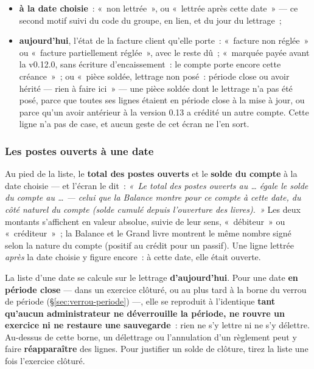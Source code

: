 \documentclass[a4paper,11pt,oneside]{article}
\begin{document}
\begin{itemize}
    \item \textbf{à la date choisie}~: «~non lettrée~», ou «~lettrée après cette date~» --- ce
          second motif suivi du code du groupe, en lien, et du jour du lettrage~;
    \item \textbf{aujourd'hui}, l'état de la facture client qu'elle porte~: «~facture non
          réglée~» ou «~facture partiellement réglée~», avec le reste dû~; «~marquée payée avant
          la v0.12.0, sans écriture d'encaissement~: le compte porte encore cette créance~»~;
          ou «~pièce soldée, lettrage non posé~: période close ou avoir hérité --- rien à faire
          ici~» --- une pièce soldée dont le lettrage n'a pas été posé, parce que toutes ses
          lignes étaient en période close à la mise à jour, ou parce qu'un avoir antérieur à la
          version 0.13 a crédité un autre compte. Cette ligne n'a pas de case, et aucun geste de
          cet écran ne l'en sort.
\end{itemize}

\subsubsection{Les postes ouverts à une date}

Au pied de la liste, le \textbf{total des postes ouverts} et le \textbf{solde du compte} à la
date choisie --- et l'écran le dit~: \emph{«~Le total des postes ouverts au \ldots{} égale le
solde du compte au \ldots{} --- celui que la Balance montre pour ce compte à cette date, du côté
naturel du compte (solde cumulé depuis l'ouverture des livres).~»} Les deux montants
s'affichent en valeur absolue, suivie de leur sens, «~débiteur~» ou «~créditeur~»~; la Balance
et le Grand livre montrent le même nombre signé selon la nature du compte (positif au crédit
pour un passif). Une ligne lettrée \emph{après} la date choisie y figure encore~: à cette date,
elle était ouverte.

\begin{keshwarning}[title={\faExclamationTriangle\ «~Au 31 décembre~» n'est pas un instantané}]
La liste d'une date se calcule sur le lettrage \textbf{d'aujourd'hui}. Pour une date \textbf{en
période close} --- dans un exercice clôturé, ou au plus tard à la borne du verrou de période
(\S\ref{sec:verrou-periode}) ---, elle se reproduit à l'identique \textbf{tant qu'aucun
administrateur ne déverrouille la période, ne rouvre un exercice ni ne restaure une
sauvegarde}~: rien ne s'y lettre ni ne s'y délettre. Au-dessus de cette borne, un délettrage
ou l'annulation d'un règlement peut y faire \textbf{réapparaître} des lignes. Pour justifier un
solde de clôture, tirez la liste une fois l'exercice clôturé.
\end{keshwarning}
\end{document}
